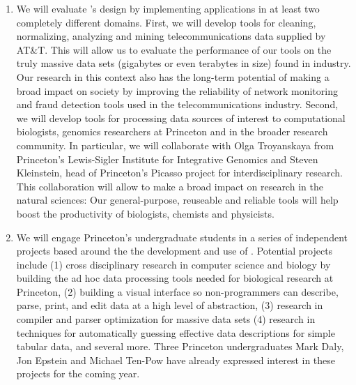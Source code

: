 \documentclass[11pt]{article}
\begin{document}
\begin{enumerate}
\item We will evaluate \datatype's design by implementing 
applications in at least two completely different domains.  First, we will
develop tools for cleaning, normalizing, analyzing and mining
telecommunications data supplied by AT\&T.  This will allow
us to evaluate the performance of our tools on the truly
massive data sets (gigabytes or even terabytes in size)  found in
industry.  Our research in this context also has the 
long-term potential of making
a broad impact on society by improving the reliability of network
monitoring and fraud detection tools
used in the telecommunications industry.  Second, we 
will develop tools for processing data sources of 
interest to computational biologists, genomics researchers 
at Princeton and in the
broader research community.  In particular, we will collaborate with
Olga Troyanskaya from Princeton's Lewis-Sigler Institute for 
Integrative Genomics and Steven Kleinstein, head of Princeton's
Picasso project for interdisciplinary research.
This collaboration will allow to make a broad impact on
research in the natural sciences:  Our general-purpose, reuseable
and reliable tools will help boost the productivity of biologists, 
chemists and physicists.

\item We will engage Princeton's undergraduate students in 
a series of independent projects based around the the development and use of
\datatype.  Potential projects include (1) cross disciplinary
research in computer science and biology by building the ad hoc
data processing tools needed for biological research at 
Princeton, (2) building a visual interface so non-programmers can
describe, parse, print, and edit data at a high level of abstraction,
(3) research in compiler and parser optimization for massive data sets 
(4) research in techniques for automatically guessing effective data 
descriptions for simple tabular data, and several more.  Three
Princeton undergraduates Mark Daly, Jon Epstein and Michael Ten-Pow
have already expressed interest in these projects for the coming year.
\end{enumerate}
\end{document}
